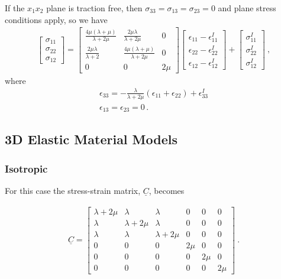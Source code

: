 If the $x_{1}x_{2}$ plane is traction free, then $\sigma_{33}=\sigma_{13}=\sigma_{23}=0$
and plane stress conditions apply, so we have
\begin{gather}
\left[\begin{array}{c}
\sigma_{11}\\
\sigma_{22}\\
\sigma_{12}
\end{array}\right]=\left[\begin{array}{ccc}
\frac{4\mu(\lambda+\mu)}{\lambda+2\mu} & \frac{2\mu\lambda}{\lambda+2\mu} & 0\\
\frac{2\mu\lambda}{\lambda+2} & \frac{4\mu(\lambda+\mu)}{\lambda+2\mu} & 0\\
0 & 0 & 2\mu
\end{array}\right]\left[\begin{array}{c}
\epsilon_{11}-\epsilon_{11}^{I}\\
\epsilon_{22}-\epsilon_{22}^{I}\\
\epsilon_{12}-\epsilon_{12}^{I}
\end{array}\right]+\left[\begin{array}{c}
\sigma_{11}^{I}\\
\sigma_{22}^{I}\\
\sigma_{12}^{I}
\end{array}\right]\:,\label{eq:11}
\end{gather}
where
\begin{equation}
\begin{gathered}\epsilon_{33}=-\frac{\lambda}{\lambda+2\mu}(\epsilon_{11}+\epsilon_{22})+\epsilon_{33}^{I}\\
\epsilon_{13}=\epsilon_{23}=0\,.
\end{gathered}
\label{eq:12}
\end{equation}



\subsection{3D Elastic Material Models}


\subsubsection{Isotropic}

For this case the stress-strain matrix, $\underline{C}$, becomes

\begin{gather}
\underline{C}=\left[\begin{array}{cccccc}
\lambda+2\mu & \lambda & \lambda & 0 & 0 & 0\\
\lambda & \lambda+2\mu & \lambda & 0 & 0 & 0\\
\lambda & \lambda & \lambda+2\mu & 0 & 0 & 0\\
0 & 0 & 0 & 2\mu & 0 & 0\\
0 & 0 & 0 & 0 & 2\mu & 0\\
0 & 0 & 0 & 0 & 0 & 2\mu
\end{array}\right]\:.\label{eq:13}
\end{gather}



